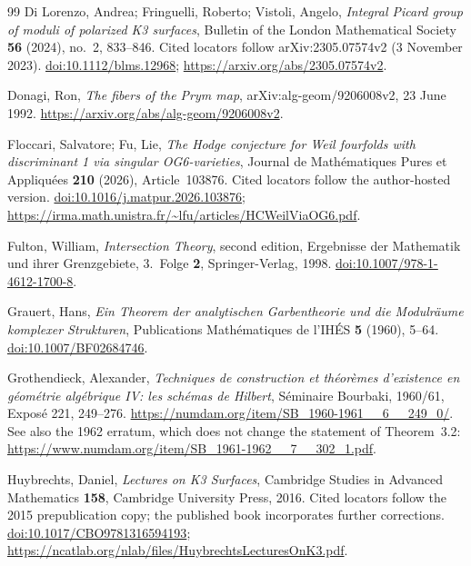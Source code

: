 \documentclass[11pt]{amsart}
\theoremstyle{definition}
\theoremstyle{remark}
\numberwithin{equation}{section}
\begin{document}
\begin{thebibliography}{99}
Di Lorenzo, Andrea; Fringuelli, Roberto; Vistoli, Angelo, \emph{Integral {Picard} group of moduli of polarized {K3} surfaces}, Bulletin of the London Mathematical Society \textbf{56} (2024), no.~2, 833--846. Cited locators follow arXiv:2305.07574v2 (3 November 2023). \href{https://doi.org/10.1112/blms.12968}{doi:10.1112/blms.12968}; \url{https://arxiv.org/abs/2305.07574v2}.

Donagi, Ron, \emph{The fibers of the Prym map}, arXiv:alg-geom/9206008v2, 23 June 1992. \url{https://arxiv.org/abs/alg-geom/9206008v2}.

Floccari, Salvatore; Fu, Lie, \emph{The Hodge conjecture for Weil fourfolds with discriminant 1 via singular OG6-varieties}, Journal de Math\'ematiques Pures et Appliqu\'ees \textbf{210} (2026), Article~103876. Cited locators follow the author-hosted version. \href{https://doi.org/10.1016/j.matpur.2026.103876}{doi:10.1016/j.matpur.2026.103876}; \url{https://irma.math.unistra.fr/~lfu/articles/HCWeilViaOG6.pdf}.

Fulton, William, \emph{Intersection Theory}, second edition, Ergebnisse der Mathematik und ihrer Grenzgebiete, 3.~Folge \textbf{2}, Springer-Verlag, 1998. \href{https://doi.org/10.1007/978-1-4612-1700-8}{doi:10.1007/978-1-4612-1700-8}.

Grauert, Hans, \emph{Ein {Theorem} der analytischen {Garbentheorie} und die {Modulr{\"a}ume} komplexer {Strukturen}}, Publications Math{\'e}matiques de l'IH{\'E}S \textbf{5} (1960), 5--64. \href{https://doi.org/10.1007/BF02684746}{doi:10.1007/BF02684746}.

Grothendieck, Alexander, \emph{Techniques de construction et th{\'e}or{\`e}mes d'existence en g{\'e}om{\'e}trie alg{\'e}brique {IV}: les sch{\'e}mas de {Hilbert}}, S{\'e}minaire Bourbaki, 1960/61, Expos{\'e} 221, 249--276. \url{https://numdam.org/item/SB_1960-1961__6__249_0/}. See also the 1962 erratum, which does not change the statement of Theorem~3.2: \url{https://www.numdam.org/item/SB_1961-1962__7__302_1.pdf}.

Huybrechts, Daniel, \emph{Lectures on {K3} Surfaces}, Cambridge Studies in Advanced Mathematics \textbf{158}, Cambridge University Press, 2016. Cited locators follow the 2015 prepublication copy; the published book incorporates further corrections. \href{https://doi.org/10.1017/CBO9781316594193}{doi:10.1017/CBO9781316594193}; \url{https://ncatlab.org/nlab/files/HuybrechtsLecturesOnK3.pdf}.


\end{thebibliography}
\end{document}
